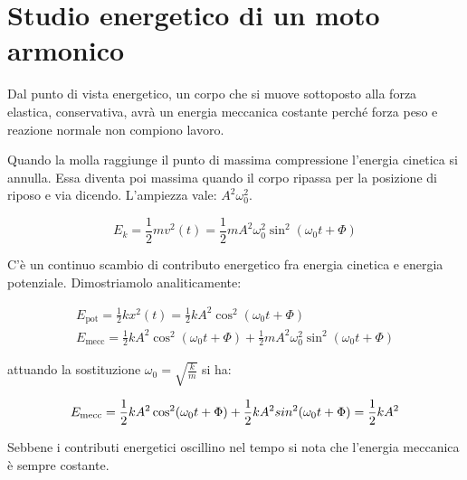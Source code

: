 \section{Studio energetico di un moto armonico}

Dal punto di vista energetico, un corpo che si muove sottoposto alla forza elastica, conservativa, avrà un energia meccanica costante perché forza peso e reazione normale non compiono lavoro.

Quando la molla raggiunge il punto di massima compressione l'energia cinetica si annulla. Essa diventa poi massima quando il corpo ripassa per la posizione di riposo e via dicendo.
L'ampiezza vale: $A^2\omega_0^2$.

\[
	E_k=\frac{1}{2}mv^2(t)=\frac{1}{2}mA^2\omega_0^2\sin^2(\omega_0 t+\Phi)
\]

C'è un continuo scambio di contributo energetico fra energia cinetica e energia potenziale. Dimostriamolo analiticamente:

\begin{gather*}
	E_{\text{pot}}=\frac{1}{2}kx^2(t)=\frac{1}{2}kA^2\cos^2(\omega_0 t+\Phi) \\
	E_{\text{mecc}}=\frac{1}{2}kA^2\cos^2(\omega_0 t+\Phi)+\frac{1}{2}mA^2\omega_0^2\sin^2(\omega_0 t+\Phi)
\end{gather*}

attuando la sostituzione $\omega_0=\sqrt{\frac{k}{m}}$ si ha:

\[
	E_{\text{mecc}}=\frac{1}{2}kA^2\cos^2(\omega_0 t+\Phi)+\frac{1}{2}kA^2\\sin^2(\omega_0 t+\Phi)=\frac{1}{2}kA^2
\]

Sebbene i contributi energetici oscillino nel tempo si nota che l'energia meccanica è sempre costante.

